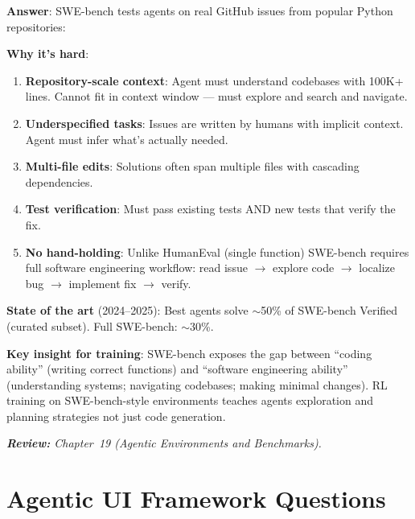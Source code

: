 \begin{questionbox}
\textbf{Answer}: SWE-bench tests agents on real GitHub issues from popular Python repositories:

\textbf{Why it’s hard}:

\begin{enumerate}
  \item \textbf{Repository-scale context}: Agent must understand codebases with 100K+ lines. Cannot fit in context window --- must explore and search and navigate.
  \item \textbf{Underspecified tasks}: Issues are written by humans with implicit context. Agent must infer what’s actually needed.
  \item \textbf{Multi-file edits}: Solutions often span multiple files with cascading dependencies.
  \item \textbf{Test verification}: Must pass existing tests AND new tests that verify the fix.
  \item \textbf{No hand-holding}: Unlike HumanEval (single function) SWE-bench requires full software engineering workflow: read issue $\to$ explore code $\to$ localize bug $\to$ implement fix $\to$ verify.
\end{enumerate}

\textbf{State of the art} (2024--2025): Best agents solve $\sim$50\% of SWE-bench Verified (curated subset). Full SWE-bench: $\sim$30\%.

\textbf{Key insight for training}: SWE-bench exposes the gap between ``coding ability'' (writing correct functions) and ``software engineering ability'' (understanding systems; navigating codebases; making minimal changes). RL training on SWE-bench-style environments teaches agents exploration and planning strategies not just code generation.

\emph{\textbf{Review:} Chapter~19 (Agentic Environments and Benchmarks).}
\end{questionbox}

\section{Agentic UI Framework Questions}
\label{agentic-ui-framework-questions}

